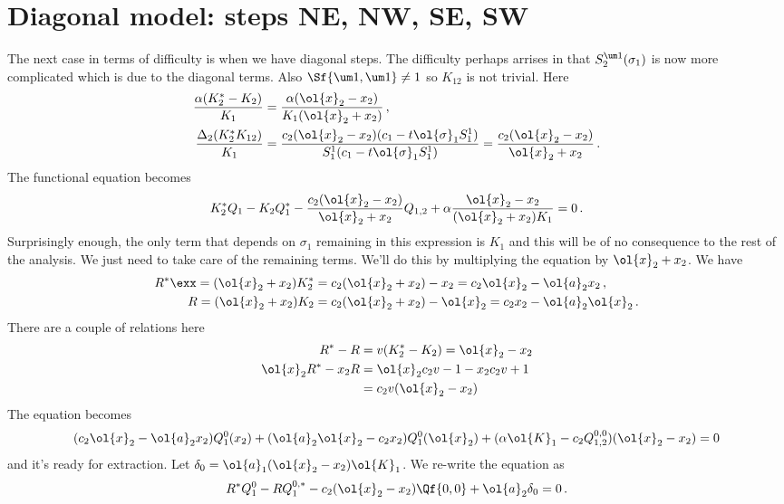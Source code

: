 \section{Diagonal model: steps NE, NW, SE, SW}
The next case in terms of difficulty is when we have diagonal steps. The difficulty perhaps arrises in that $S_2^{\um 1}(\sigma_1)$ is now more complicated which is due to the diagonal terms. Also $\Sf{\um 1, \um 1} \neq 1$ so $K_{12}$ is not trivial. Here
\begin{align}
	\frac{\alpha(K_2^\ast -K_2)}{K_1}  &= \frac{\alpha (\ol{x}_2 - x_2)}{K_1(\ol{x}_2+x_2)}\,,\\
	\frac{\Delta_2(K_2^\ast K_{12})}{K_1} &= \frac{c_2(\ol{x}_2-x_2)(c_1- t \ol{\sigma}_1S_1^1)}{S_1^1(c_1-t\ol{\sigma}_1S_1^1)} = \frac{c_2(\ol{x}_2-x_2)}{\ol{x}_2+x_2}\,.
\end{align}
The functional equation becomes
\begin{align}
   K_2^\ast Q_1 - K_2 Q_1^\ast -\frac{c_2(\ol{x}_2-x_2)}{\ol{x}_2+x_2}Q_{1,2}+\alpha\frac{\ol{x}_2-x_2}{(\ol{x}_2+x_2)K_1}= 0\,.
\end{align}
Surprisingly enough, the only term that depends on $\sigma_1$ remaining in this expression is $K_1$ and this will be of no consequence to the rest of the analysis. We just need to take care of the remaining terms. We'll do this by multiplying the equation by $\ol{x}_2+x_2$. We have
\begin{align}
	R^\ast \exx= (\ol{x}_2+x_2) K_2^\ast &= c_2(\ol{x}_2+x_2)-x_2 = c_2\ol{x}_2- \ol{a}_2x_2\,,\\
	R = (\ol{x}_2+x_2) K_2 &= c_2(\ol{x}_2+x_2)-\ol{x}_2 = c_2x_2- \ol{a}_2\ol{x}_2\,.
\end{align}
There are a couple of relations here
\begin{align}
	R^\ast - R &= v(K_2^\ast-K_2) = \ol{x}_2-x_2\\
	\ol{x}_2R^\ast - x_2 R &= \ol{x}_2c_2v-1- x_2 c_2v+1 \\
				      & = c_2v(\ol{x}_2-x_2)
\end{align}
The equation becomes
\begin{align}
(c_2\ol{x}_2- \ol{a}_2x_2)Q_1^0(x_2)+ ( \ol{a}_2\ol{x}_2-c_2x_2) Q_1^0(\ol{x}_2)+(\alpha \ol{K}_1 - c_2Q_{1,2}^{0,0})(\ol{x}_2-x_2)= 0
\end{align}
and it's ready for extraction. Let $\delta_0 =  \ol{a}_1(\ol{x}_2-x_2)\ol{K}_1$. We re-write the equation as
\begin{align}\label{zero-order}
    R^\ast Q_1^0 -R Q_1^{0,\ast} - c_2(\ol{x}_2-x_2)\Qf{0,0} + \ol{a}_2\delta_0 = 0\,.
\end{align}

